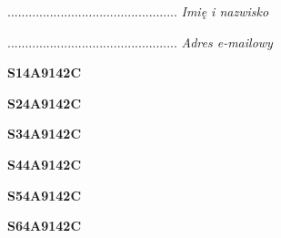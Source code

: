\begin{turn}{90}\begin{minipage}{\linewidth} \vspace{20mm} ................................................  \textit{Imię i nazwisko}\end{minipage}\end{turn}

\begin{turn}{90}\begin{minipage}{\linewidth} \vspace{20mm} ................................................  \textit{Adres e-mailowy}\end{minipage}\end{turn}

\begin{turn}{90}\huge \begin{minipage}{\linewidth} \vspace{10mm}\textbf{S14A9142C}\end{minipage}\end{turn}

\begin{turn}{90}\huge \begin{minipage}{\linewidth} \vspace{10mm}\textbf{S24A9142C}\end{minipage}\end{turn}

\begin{turn}{90}\huge \begin{minipage}{\linewidth} \vspace{10mm}\textbf{S34A9142C}\end{minipage}\end{turn}

\begin{turn}{90}\huge \begin{minipage}{\linewidth} \vspace{10mm}\textbf{S44A9142C}\end{minipage}\end{turn}

\begin{turn}{90}\huge \begin{minipage}{\linewidth} \vspace{10mm}\textbf{S54A9142C}\end{minipage}\end{turn}

\begin{turn}{90}\huge \begin{minipage}{\linewidth} \vspace{10mm}\textbf{S64A9142C}\end{minipage}\end{turn}

